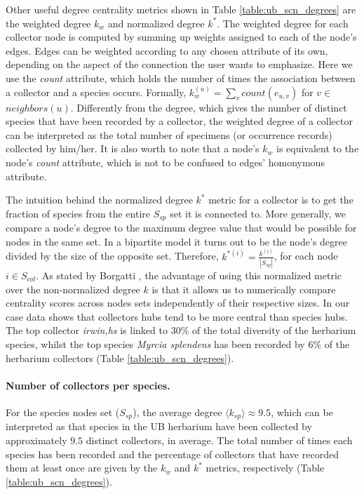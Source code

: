   
Other useful degree centrality metrics shown in Table \ref{table:ub_scn_degrees} are the weighted degree $k_w$ and normalized degree $k^*$. The weighted degree for each collector node is computed by summing up weights assigned to each of the node's edges. Edges can be weighted according to any chosen attribute of its own, depending on the aspect of the connection the user wants to emphasize. Here we use the \textit{count} attribute, which holds the number of times the association between a collector and a species occurs. Formally, $k_w^{(u)} = \sum_{v} count(e_{u,v})$ for $v \in$ $neighbors(u)$. Differently from the degree, which gives the number of distinct species that have been recorded by a collector, the weighted degree of a collector can be interpreted as the total number of specimens (or occurrence records) collected by him/her. It is also worth to note that a node's $k_w$ is equivalent to the node's \textit{count} attribute, which is not to be confused to edges' homonymous attribute.

The intuition behind the normalized degree $k^*$ metric for a collector is to get the fraction of species from the entire $S_{sp}$ set it is connected to. More generally, we compare a node's degree to the maximum degree value that would be possible for nodes in the same set. In a bipartite model it turns out to be the node's degree divided by the size of the opposite set. Therefore, $k^{*(i)} = \frac{k^{(i)}}{|S_{sp}|}$, for each node $i \in S_{col}$. 
As stated by Borgatti \cite{Borgatti2015}, the advantage of using this normalized metric over the non-normalized degree $k$ is that it allows us to numerically compare centrality scores across nodes sets independently of their respective sizes. 
In our case data shows that collectors hubs tend to be more central than species hubs. The top collector \textit{irwin,hs} is linked to $30\%$ of the total diversity of the herbarium species, whilst the top species \textit{Myrcia splendens} has been recorded by $6\%$ of the herbarium collectors (Table \ref{table:ub_scn_degrees}). 



\paragraph*{Number of collectors per species.}
For the species nodes set ($S_{sp}$), the average degree $\langle k_{sp}\rangle \approx 9.5$, which can be interpreted as that species in the UB herbarium have been collected by approximately $9.5$ distinct collectors, in average. 
The total number of times each species has been recorded and the percentage of collectors that have recorded them at least once are given by the $k_w$ and $k^*$ metrics, respectively (Table \ref{table:ub_scn_degrees}).

